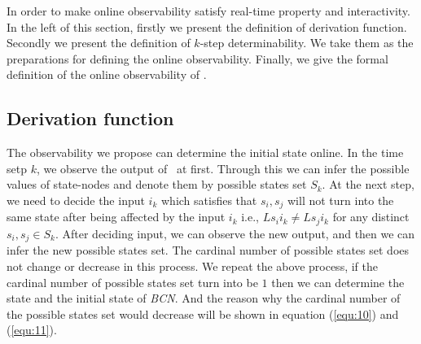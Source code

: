 In order to make online observability satisfy real-time property and interactivity. In the left of this section, firstly we present the definition of derivation function. Secondly we present the definition of $k$-step determinability. We take them as the preparations for defining the online observability. Finally, we give the formal definition of the online observability of \BCNs. 
\subsection{Derivation function}
The observability we propose can determine the initial state online.
 In the time setp $k$, we observe the output of \BCNs\ at first. Through this we can infer the possible values of state-nodes and denote them by possible states set $S_k$. %
 At the next step, we need to decide the input $i_k$ which satisfies that %
$s_i, s_j$ 
 will not turn into the same state after being affected by the input $i_k$ i.e., $Ls_i i_k\neq Ls_j i_k$ for any distinct $s_i, s_j\in S_k$. After deciding input, we can observe the new output, and then we can infer the new possible states set. The cardinal number of possible states set does not change or decrease in this process. We repeat the above process, if the cardinal number of possible states set turn into be $1$ then we can determine the state and the initial state of {\em BCN}. And the reason why the cardinal number of the possible states set would decrease will be shown in equation (\ref{equ:10}) and (\ref{equ:11}). 
 
